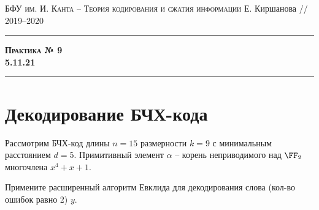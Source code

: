 \documentclass[11pt]{exam}
\theoremstyle{definition}
\begin{document}
	{\noindent
		\textsc{БФУ им. И. Канта -- Теория кодирования и сжатия информации}
		\hfill {Е. Киршанова // 2019--2020\\}
	\hrule
	\begin{center}
		{\Large\textbf{
				\textsc{Практика № 9} \\[5pt] {5.11.21}
		} } 
	\end{center}
	\hrule \vspace{5mm}
	
	\thispagestyle{empty}
	
	\vspace{0.2cm}
	
\section{Декодирование БЧХ-кода}
		Рассмотрим БЧХ-код длины $n=15$ размерности $k=9$ с минимальным расстоянием $d=5$. %
		Примитивный элемент $\alpha$ -- корень неприводимого над $\FF_2$ многочлена $x^4+x+1$.
	
		Примените расширенный алгоритм Евклида для декодирования слова (кол-во ошибок равно 2) $y$. \\
		
}
\end{document}
